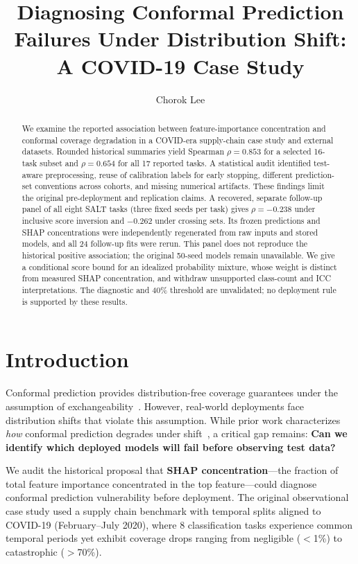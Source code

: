 \documentclass[accepted]{uai2026} %
\title{Diagnosing Conformal Prediction Failures Under Distribution Shift:\\A COVID-19 Case Study}
\author[1]{Chorok Lee}
\affil[1]{%
    Korea Advanced Institute of Science and Technology (KAIST)\\
    Daejeon, South Korea
}
\affil[1]{\texttt{choroklee@kaist.ac.kr}}
\begin{document}
\maketitle

\begin{abstract}
We examine the reported association between feature-importance concentration and conformal coverage degradation in a COVID-era supply-chain case study and external datasets. Rounded historical summaries yield Spearman $\rho=0.853$ for a selected 16-task subset and $\rho=0.654$ for all 17 reported tasks. A statistical audit identified test-aware preprocessing, reuse of calibration labels for early stopping, different prediction-set conventions across cohorts, and missing numerical artifacts. These findings limit the original pre-deployment and replication claims. A recovered, separate follow-up panel of all eight SALT tasks (three fixed seeds per task) gives $\rho=-0.238$ under inclusive score inversion and $-0.262$ under crossing sets. Its frozen predictions and SHAP concentrations were independently regenerated from raw inputs and stored models, and all 24 follow-up fits were rerun. This panel does not reproduce the historical positive association; the original 50-seed models remain unavailable. We give a conditional score bound for an idealized probability mixture, whose weight is distinct from measured SHAP concentration, and withdraw unsupported class-count and ICC interpretations. The diagnostic and 40\% threshold are unvalidated; no deployment rule is supported by these results.
\end{abstract}

\section{Introduction}\label{sec:intro}

Conformal prediction provides distribution-free coverage guarantees under the assumption of exchangeability~\citep{vovk2005algorithmic}. However, real-world deployments face distribution shifts that violate this assumption. While prior work characterizes \textit{how} conformal prediction degrades under shift~\citep{tibshirani2019conformal, barber2023conformal}, a critical gap remains: \textbf{Can we identify which deployed models will fail before observing test data?}

We audit the historical proposal that \textbf{SHAP concentration}---the fraction of total feature importance concentrated in the top feature---could diagnose conformal prediction vulnerability before deployment. The original observational case study used a supply chain benchmark with temporal splits aligned to COVID-19 (February--July 2020), where 8 classification tasks experience common temporal periods yet exhibit coverage drops ranging from negligible ($<$1\%) to catastrophic ($>$70\%).
\end{document}

